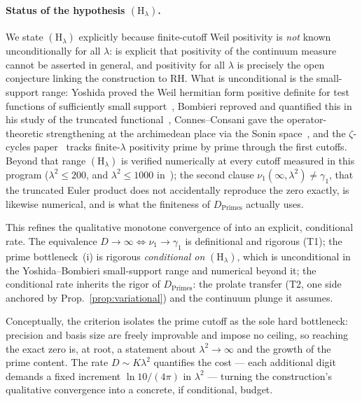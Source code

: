 \documentclass[11pt,a4paper]{article}
\begin{document}
\paragraph{Status of the hypothesis $(\mathrm{H}_\lambda)$.}
We state $(\mathrm{H}_\lambda)$ explicitly because finite-cutoff Weil
positivity is \emph{not} known unconditionally for all $\lambda$:
\cite{CCM2025} is explicit that positivity of the continuum measure cannot be
asserted in general, and positivity for all $\lambda$ is precisely the open
conjecture linking the construction to RH. What is unconditional is the
small-support range: Yoshida proved the Weil hermitian form positive definite
for test functions of sufficiently small support~\cite{Yoshida1992}, Bombieri
reproved and quantified this in his study of the truncated
functional~\cite{Bombieri2000}, Connes--Consani gave the operator-theoretic
strengthening at the archimedean place via the Sonin
space~\cite{ConnesConsaniSelecta}, and the $\zeta$-cycles
paper~\cite{ConnesConsaniZC} tracks finite-$\lambda$ positivity prime by prime
through the first cutoffs. Beyond that range $(\mathrm{H}_\lambda)$ is verified
numerically at every cutoff measured in this program ($\lambda^2\le200$, and
$\lambda^2\le1000$ in~\cite{AndrewsA}); the second clause
$\nu_1(\infty,\lambda^2)\neq\gamma_1$, that the truncated Euler product does
not accidentally reproduce the zero exactly, is likewise numerical, and is
what the finiteness of $D_{\mathrm{Primes}}$ actually uses.

\noindent This refines the qualitative monotone convergence of
\cite[Prop.~3.4]{CCM2025} into an explicit, conditional rate. The equivalence
$D\to\infty\Leftrightarrow\nu_1\to\gamma_1$ is definitional and rigorous (T1);
the prime bottleneck~(i) is rigorous \emph{conditional on}
$(\mathrm{H}_\lambda)$, which is unconditional in the Yoshida--Bombieri
small-support range and numerical beyond it; the conditional rate inherits the
rigor of $D_{\mathrm{Primes}}$: the prolate transfer (T2, one side anchored
by Prop.~\ref{prop:variational}) and the continuum plunge it assumes.

Conceptually, the criterion isolates the prime cutoff as the sole hard
bottleneck: precision and basis size are freely improvable and impose no ceiling,
so reaching the exact zero is, at root, a statement about $\lambda^2\to\infty$ and
the growth of the prime content. The rate $D\sim K\lambda^2$ quantifies the cost
--- each additional digit demands a fixed increment $\ln10/(4\pi)$ in $\lambda^2$
--- turning the construction's qualitative convergence into a concrete, if
conditional, budget.
\end{document}
